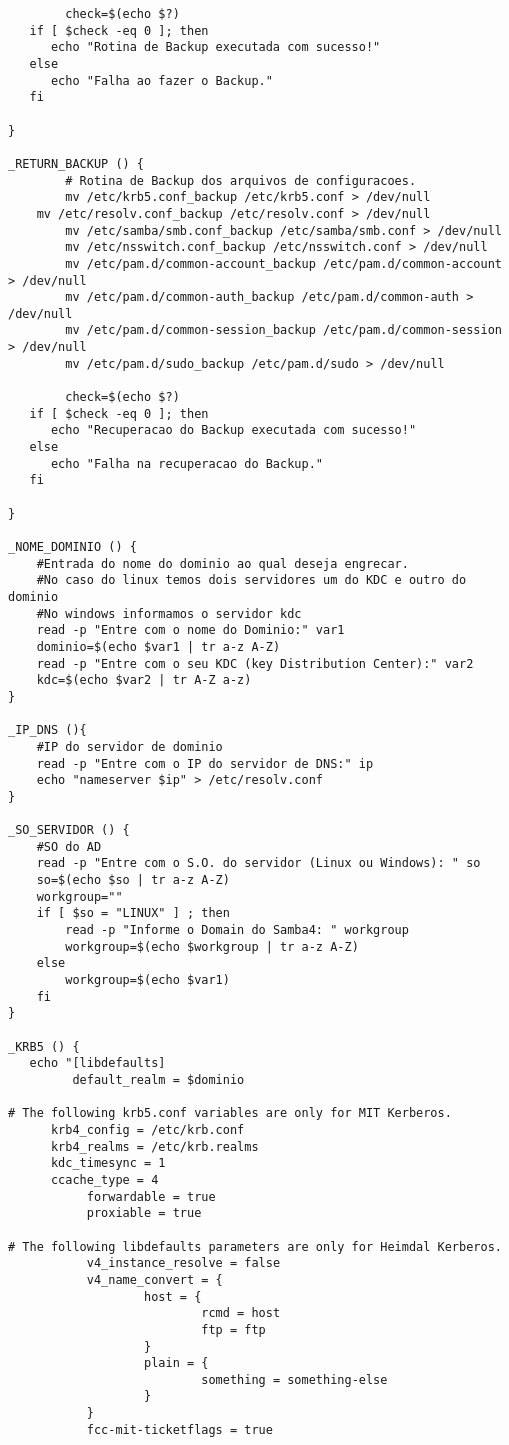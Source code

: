 \begin{lstlisting}
        check=$(echo $?)
   if [ $check -eq 0 ]; then
      echo "Rotina de Backup executada com sucesso!"
   else
      echo "Falha ao fazer o Backup."
   fi
         
}

_RETURN_BACKUP () {
        # Rotina de Backup dos arquivos de configuracoes.
        mv /etc/krb5.conf_backup /etc/krb5.conf > /dev/null
	mv /etc/resolv.conf_backup /etc/resolv.conf > /dev/null
        mv /etc/samba/smb.conf_backup /etc/samba/smb.conf > /dev/null
        mv /etc/nsswitch.conf_backup /etc/nsswitch.conf > /dev/null
        mv /etc/pam.d/common-account_backup /etc/pam.d/common-account > /dev/null
        mv /etc/pam.d/common-auth_backup /etc/pam.d/common-auth > /dev/null
        mv /etc/pam.d/common-session_backup /etc/pam.d/common-session > /dev/null
        mv /etc/pam.d/sudo_backup /etc/pam.d/sudo > /dev/null
         
        check=$(echo $?)
   if [ $check -eq 0 ]; then
      echo "Recuperacao do Backup executada com sucesso!"
   else
      echo "Falha na recuperacao do Backup."
   fi
         
}
 
_NOME_DOMINIO () {
    #Entrada do nome do dominio ao qual deseja engrecar.
	#No caso do linux temos dois servidores um do KDC e outro do dominio
	#No windows informamos o servidor kdc
    read -p "Entre com o nome do Dominio:" var1
    dominio=$(echo $var1 | tr a-z A-Z)
    read -p "Entre com o seu KDC (key Distribution Center):" var2
    kdc=$(echo $var2 | tr A-Z a-z)         
}

_IP_DNS (){
	#IP do servidor de dominio
	read -p "Entre com o IP do servidor de DNS:" ip
	echo "nameserver $ip" > /etc/resolv.conf
}

_SO_SERVIDOR () {
	#SO do AD	
	read -p "Entre com o S.O. do servidor (Linux ou Windows): " so
	so=$(echo $so | tr a-z A-Z)
	workgroup=""
	if [ $so = "LINUX" ] ; then
		read -p "Informe o Domain do Samba4: " workgroup
		workgroup=$(echo $workgroup | tr a-z A-Z)
	else
		workgroup=$(echo $var1)
	fi
}
 
_KRB5 () {
   echo "[libdefaults]
         default_realm = $dominio
 
# The following krb5.conf variables are only for MIT Kerberos.
      krb4_config = /etc/krb.conf
      krb4_realms = /etc/krb.realms
      kdc_timesync = 1
      ccache_type = 4
           forwardable = true
           proxiable = true
 
# The following libdefaults parameters are only for Heimdal Kerberos.
           v4_instance_resolve = false
           v4_name_convert = {
                   host = {
                           rcmd = host
                           ftp = ftp
                   }  
                   plain = {
                           something = something-else
                   }  
           }  
           fcc-mit-ticketflags = true
 

\end{lstlisting}
